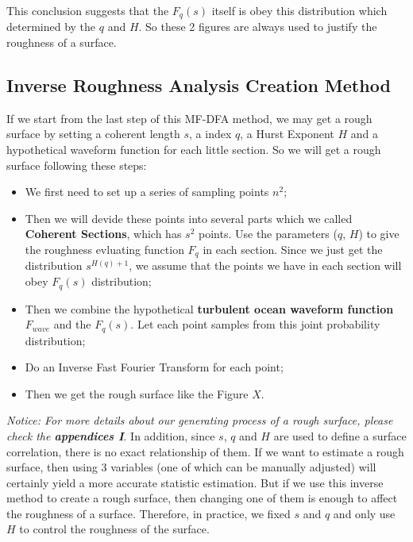 \documentclass{mcmthesis}
\begin{document}
    This conclusion suggests that the $F_q(s)$ itself is obey this distribution which determined by the $q$ and $H$. So these 2 figures are always used to justify the roughness of a surface.

  \subsection{Inverse Roughness Analysis Creation Method}

    If we start from the last step of this MF-DFA method, we may get a rough surface by setting a coherent length $s$, a index $q$, a Hurst Exponent $H$ and a hypothetical waveform function for each little section. So we will get a rough surface following these steps:

      \begin{itemize}
        \item We first need to set up a series of sampling points $n^2$; \\
        \item Then we will devide these points into several parts which we called \textbf{Coherent Sections}, which has $s^2$ points. Use the parameters ($q$, $H$) to give the roughness evluating function $F_q$ in each section. Since we just get the distribution $s^{H(q) + 1}$, we assume that the points we have in each section will obey $F_q(s)$ distribution; \\
        \item Then we combine the hypothetical \textbf{turbulent ocean waveform function $F_{wave}$ } and the $F_q(s)$. Let each point samples from this joint probability distribution; \\
        \item Do an Inverse Fast Fourier Transform for each point;\\
        \item Then we get the rough surface like the Figure $X$.
      \end{itemize}

    \emph{Notice: For more details about our generating process of a rough surface, please check the \textbf{appendices I}}.
    In addition, since $s$, $q$ and $H$ are used to define a surface correlation, there is no exact relationship of them. If we want to estimate a rough surface, then using 3 variables (one of which can be manually adjusted) will certainly yield a more accurate statistic estimation. But if we use this inverse method to create a rough surface, then changing one of them is enough to affect the roughness of a surface. Therefore, in practice, we fixed $s$ and $q$ and only use $H$ to control the roughness of the surface.
\end{document}
